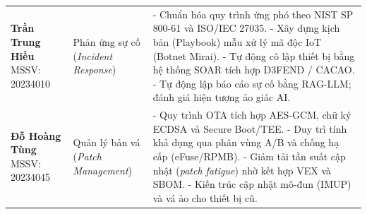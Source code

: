 \documentclass[../DoAn.tex]{subfiles}
\begin{document}
\begin{table}[H]
\begin{tabularx}{\textwidth}{>{\raggedright\arraybackslash}p{3cm} >{\raggedright\arraybackslash}p{3cm} X}
\textbf{Trần Trung Hiếu} \newline MSSV: 20234010 
& Phản ứng sự cố \newline (\textit{Incident Response}) 
& - Chuẩn hóa quy trình ứng phó theo NIST SP 800-61 và ISO/IEC 27035. \newline
  - Xây dựng kịch bản (Playbook) mẫu xử lý mã độc IoT (Botnet Mirai). \newline
  - Tự động cô lập thiết bị bằng hệ thống SOAR tích hợp D3FEND / CACAO. \newline
  - Tự động lập báo cáo sự cố bằng RAG-LLM; đánh giá hiện tượng ảo giác AI. \\ \addlinespace[0.6em]

\textbf{Đỗ Hoàng Tùng} \newline MSSV: 20234045 
& Quản lý bản vá \newline (\textit{Patch Management}) 
& - Quy trình OTA tích hợp AES-GCM, chữ ký ECDSA và Secure Boot/TEE. \newline
  - Duy trì tính khả dụng qua phân vùng A/B và chống hạ cấp (eFuse/RPMB). \newline
  - Giảm tải tần suất cập nhật (\textit{patch fatigue}) nhờ kết hợp VEX và SBOM. \newline
  - Kiến trúc cập nhật mô-đun (IMUP) và vá ảo cho thiết bị cũ. \\
\bottomrule
\end{tabularx}
\end{table}
\end{document}
